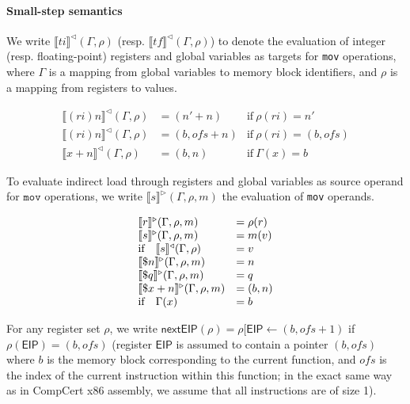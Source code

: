 \paragraph{Small-step semantics}

We write $\llbracket \mathit{ti} \rrbracket^\triangleleft(\Gamma, \rho)$
(resp. $\llbracket \mathit{tf} \rrbracket^\triangleleft(\Gamma, \rho)$)
to denote the evaluation of integer (resp. floating-point) registers
and global variables as targets for \texttt{mov} operations, where
$\Gamma$ is a mapping from global variables to memory block
identifiers, and $\rho$ is a mapping from registers to values.

\[
\begin{array}{lll}
\llbracket (\mathit{ri})n \rrbracket^\triangleleft(\Gamma, \rho) & = (n' + n) & \text{if} ~ \rho(\mathit{ri}) = n' \\
\llbracket (\mathit{ri})n \rrbracket^\triangleleft(\Gamma, \rho) & = (b, \mathit{ofs}+n) & \text{if} ~ \rho(\mathit{ri}) = (b, \mathit{ofs}) \\
\llbracket x + n  \rrbracket^\triangleleft(\Gamma, \rho) & = (b, n) & \text{if} ~ \Gamma(x) = b
\end{array}
\]

To evaluate indirect load through registers and global variables as
source operand for $\mathtt{mov}$ operations, we write $\llbracket s
\rrbracket^\triangleright(\Gamma, \rho, m)$ the evaluation of
\texttt{mov} operands.

\[
\begin{array}{lll}
\multicolumn{2}{l}{\llbracket r \rrbracket^\triangleright(\Gamma, \rho, m)} & = \rho(r) \\
\multicolumn{2}{l}{\llbracket s \rrbracket^\triangleright(\Gamma, \rho, m) } & = m(v) \\
\text{if} & \llbracket s \rrbracket^\triangleleft(\Gamma, \rho) & = v \\
\multicolumn{2}{l}{\llbracket \$ n \rrbracket^\triangleright(\Gamma, \rho, m)} & = n \\
\multicolumn{2}{l}{\llbracket \$ q \rrbracket^\triangleright(\Gamma, \rho, m)} & = q \\
\multicolumn{2}{l}{\llbracket \$ x+n \rrbracket^\triangleright(\Gamma, \rho, m)} & = (b, n) \\
\text{if} & \Gamma(x) & = b 
\end{array}
\]

For any register set $\rho$, we write $\mathsf{nextEIP}(\rho) =
\rho[\mathsf{EIP} \leftarrow (b, \mathit{ofs}+1)$ if $\rho(\mathsf{EIP})
  = (b, \mathit{ofs})$ (register $\mathsf{EIP}$ is assumed to contain a
  pointer $(b, \mathit{ofs})$ where $b$ is the memory block
  corresponding to the current function, and $\mathit{ofs}$ is the
  index of the current instruction within this function; in the exact
  same way as in CompCert x86 assembly, we assume that all
  instructions are of size 1).

